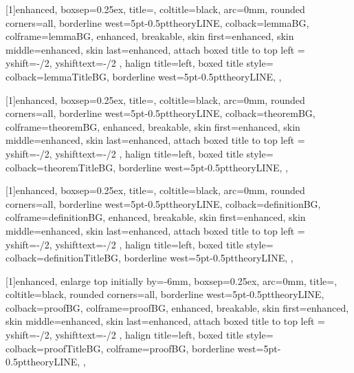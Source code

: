 
[1]{enhanced,
    boxsep=0.25ex,
    title=\textbf{},
    coltitle=black,
    arc=0mm,
    rounded corners=all,
    borderline west={5pt}{-0.5pt}{theoryLINE},
    colback=lemmaBG,
    colframe=lemmaBG,
    enhanced,
    breakable,
    skin first=enhanced,
    skin middle=enhanced,
    skin last=enhanced,
    attach boxed title to top left ={
        yshift=-\tcboxedtitleheight/2,
        yshifttext=-\tcboxedtitleheight/2
    },
    halign title=left,
    boxed title style={
        colback=lemmaTitleBG,
        borderline west={5pt}{-0.5pt}{theoryLINE},
    },
}

[1]{enhanced,
    boxsep=0.25ex,
    title=,
    coltitle=black,
    arc=0mm,
    rounded corners=all,
    borderline west={5pt}{-0.5pt}{theoryLINE},
    colback=theoremBG,
    colframe=theoremBG,
    enhanced,
    breakable,
    skin first=enhanced,
    skin middle=enhanced,
    skin last=enhanced,
    attach boxed title to top left ={
        yshift=-\tcboxedtitleheight/2,
        yshifttext=-\tcboxedtitleheight/2
    },
    halign title=left,
    boxed title style={
        colback=theoremTitleBG,
        borderline west={5pt}{-0.5pt}{theoryLINE},
    },
}

[1]{enhanced,
    boxsep=0.25ex,
    title=,
    coltitle=black,
    arc=0mm,
    rounded corners=all,
    borderline west={5pt}{-0.5pt}{theoryLINE},
    colback=definitionBG,
    colframe=definitionBG,
    enhanced,
    breakable,
    skin first=enhanced,
    skin middle=enhanced,
    skin last=enhanced,
    attach boxed title to top left ={
        yshift=-\tcboxedtitleheight/2,
        yshifttext=-\tcboxedtitleheight/2
    },
    halign title=left,
    boxed title style={
        colback=definitionTitleBG,
        borderline west={5pt}{-0.5pt}{theoryLINE},
    },
}

[1]{enhanced,
    enlarge top initially by=-6mm,
    boxsep=0.25ex,
    arc=0mm,
    title=,
    coltitle=black,
    rounded corners=all,
    borderline west={5pt}{-0.5pt}{theoryLINE},
    colback=proofBG,
    colframe=proofBG,
    enhanced,
    breakable,
    skin first=enhanced,
    skin middle=enhanced,
    skin last=enhanced,
    attach boxed title to top left ={
        yshift=-\tcboxedtitleheight/2,
        yshifttext=-\tcboxedtitleheight/2
    },
    halign title=left,
    boxed title style={
        colback=proofTitleBG,
        colframe=proofBG,
        borderline west={5pt}{-0.5pt}{theoryLINE},
    },
}

